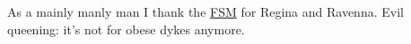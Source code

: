 As a mainly manly man I thank the \href{http://www.venganza.org/}{FSM}
for Regina and Ravenna. Evil queening: it's not for obese dykes anymore.





%